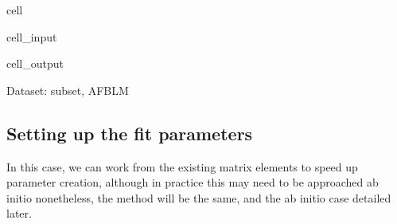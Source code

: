 \documentclass[letterpaper,table,10pt,english]{jupyterBook}
\begin{document}
\begin{sphinxuseclass}{cell}
\begin{sphinxVerbatimInput}
\begin{sphinxuseclass}{cell_input}
\begin{sphinxVerbatim}[commandchars=\\\{\}]
\PYG{p}{[}\PYG{p}{]}\PYG{p}{[}\PYG{p}{]}  \PYG{p}{[}\PYG{p}{]}\PYG{p}{[}\PYG{p}{]}  
\PYG{p}{[}\PYG{p}{]}\PYG{p}{[}\PYG{p}{]}  \PYG{p}{[}\PYG{p}{]}\PYG{p}{[}\PYG{p}{]}\PYG{p}{[}\PYG{p}{]}\PYG{p}{[}\PYG{p}{]}   

\end{sphinxVerbatim}

\end{sphinxuseclass}\end{sphinxVerbatimInput}
\begin{sphinxVerbatimOutput}

\begin{sphinxuseclass}{cell_output}
\begin{sphinxVerbatim}[commandchars=\\\{\}]
Dataset: subset, AFBLM
\end{sphinxVerbatim}

\noindent{}

\end{sphinxuseclass}\end{sphinxVerbatimOutput}

\end{sphinxuseclass}

\subsection{Setting up the fit parameters}
\label{\detokenize{part2/basic_fitting_numerics_intro_260423:setting-up-the-fit-parameters}}
\sphinxAtStartPar
In this case, we can work from the existing matrix elements to speed up parameter creation, although in practice this may need to be approached ab initio \sphinxhyphen{} nonetheless, the method will be the same, and the ab initio case detailed later.
\end{document}
